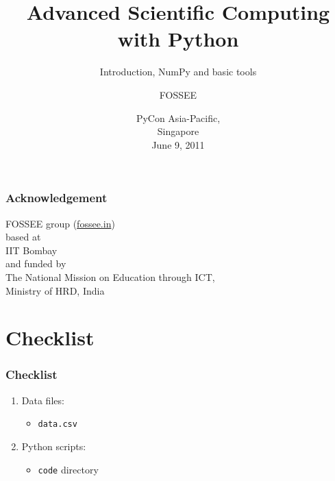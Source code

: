 \documentclass[14pt,compress]{beamer}
\title[Advanced Sci Comp.]{Advanced Scientific Computing with
Python}
\subtitle{Introduction, NumPy and basic tools}
\author[FOSSEE group] {FOSSEE}
\institute[IIT Bombay] {Department of Aerospace Engineering\\IIT Bombay}
\date[] {PyCon Asia-Pacific,\\
Singapore\\
June 9, 2011
}
\newcommand{\typ}[1]{\lstinline{#1}}
\begin{document}
\begin{frame}
  \maketitle
\end{frame}


\begin{frame}
    \frametitle{Acknowledgement}
    \Large
    \begin{center}
        \alert{FOSSEE group (\url{fossee.in})} \\
        based at\\ 
        \alert{IIT Bombay}\\
        and funded by\\
        The National Mission on Education through ICT, \\
        \alert{Ministry of HRD, India}
    \end{center}
\end{frame}

\section{Checklist}
\begin{frame}
\frametitle{Checklist}
  \begin{enumerate}
    \item Data files: 
      \begin{itemize}
      \item \typ{data.csv}
      \end{itemize}
    \item Python scripts: 
      \begin{itemize}
          \item \typ{code} directory
      \end{itemize}
  \end{enumerate}
\end{frame}
\end{document}
